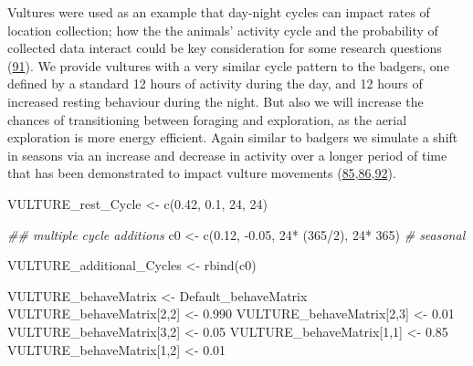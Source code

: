 \documentclass[10pt,a4paper]{article}
\newenvironment{Shaded}{}{}
\newcommand{\CommentTok}[1]{\textit{#1}}
\newcommand{\DecValTok}[1]{#1}
\newcommand{\DocumentationTok}[1]{\textit{#1}}
\newcommand{\FloatTok}[1]{#1}
\newcommand{\FunctionTok}[1]{#1}
\newcommand{\NormalTok}[1]{#1}
\newcommand{\OtherTok}[1]{#1}
\newcommand{\SpecialCharTok}[1]{#1}
\begin{document}
Vultures were used as an example that day-night cycles can impact rates of location collection; how the the animals' activity cycle and the probability of collected data interact could be key consideration for some research questions (\protect\hyperlink{ref-silva_seasonal_2017}{91}).
We provide vultures with a very similar cycle pattern to the badgers, one defined by a standard 12 hours of activity during the day, and 12 hours of increased resting behaviour during the night.
But also we will increase the chances of transitioning between foraging and exploration, as the aerial exploration is more energy efficient.
Again similar to badgers we simulate a shift in seasons via an increase and decrease in activity over a longer period of time that has been demonstrated to impact vulture movements (\protect\hyperlink{ref-hribsek_first_2021}{85},\protect\hyperlink{ref-garcia-jimenez_drivers_2018}{86},\protect\hyperlink{ref-peshev_new_2021}{92}).

\begin{Shaded}
\begin{Highlighting}[]
\NormalTok{VULTURE\_rest\_Cycle }\OtherTok{\textless{}{-}} \FunctionTok{c}\NormalTok{(}\FloatTok{0.42}\NormalTok{, }\FloatTok{0.1}\NormalTok{, }\DecValTok{24}\NormalTok{, }\DecValTok{24}\NormalTok{)}

\DocumentationTok{\#\# multiple cycle additions}
\NormalTok{c0 }\OtherTok{\textless{}{-}} \FunctionTok{c}\NormalTok{(}\FloatTok{0.12}\NormalTok{, }\SpecialCharTok{{-}}\FloatTok{0.05}\NormalTok{, }\DecValTok{24}\SpecialCharTok{*}\NormalTok{ (}\DecValTok{365}\SpecialCharTok{/}\DecValTok{2}\NormalTok{), }\DecValTok{24}\SpecialCharTok{*} \DecValTok{365}\NormalTok{) }\CommentTok{\# seasonal}

\NormalTok{VULTURE\_additional\_Cycles }\OtherTok{\textless{}{-}} \FunctionTok{rbind}\NormalTok{(c0)}

\NormalTok{VULTURE\_behaveMatrix }\OtherTok{\textless{}{-}}\NormalTok{ Default\_behaveMatrix}
\NormalTok{VULTURE\_behaveMatrix[}\DecValTok{2}\NormalTok{,}\DecValTok{2}\NormalTok{] }\OtherTok{\textless{}{-}} \FloatTok{0.990}
\NormalTok{VULTURE\_behaveMatrix[}\DecValTok{2}\NormalTok{,}\DecValTok{3}\NormalTok{] }\OtherTok{\textless{}{-}} \FloatTok{0.01}
\NormalTok{VULTURE\_behaveMatrix[}\DecValTok{3}\NormalTok{,}\DecValTok{2}\NormalTok{] }\OtherTok{\textless{}{-}} \FloatTok{0.05}
\NormalTok{VULTURE\_behaveMatrix[}\DecValTok{1}\NormalTok{,}\DecValTok{1}\NormalTok{] }\OtherTok{\textless{}{-}} \FloatTok{0.85}
\NormalTok{VULTURE\_behaveMatrix[}\DecValTok{1}\NormalTok{,}\DecValTok{2}\NormalTok{] }\OtherTok{\textless{}{-}} \FloatTok{0.01}
\end{Highlighting}
\end{Shaded}
\end{document}
